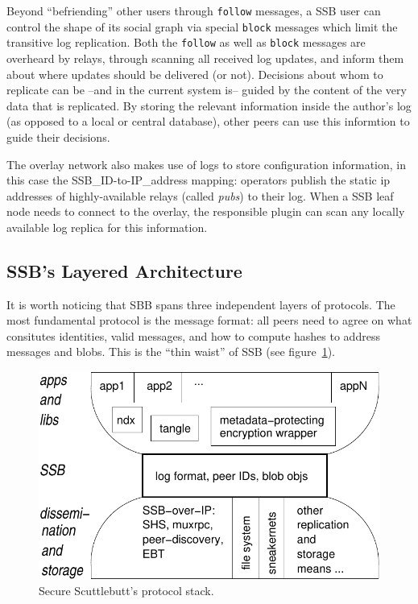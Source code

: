 \documentclass[9pt,sigconf,rewiew]{acmart}
\begin{document}
Beyond ``befriending'' other users through {\tt follow} messages, a SSB user can control the shape of its social graph via special {\tt block} messages which limit the transitive log replication. Both the {\tt follow} as well as {\tt block} messages are overheard by relays, through scanning all received log updates, and inform them about where updates should be delivered (or not). Decisions about whom to replicate can be --and in the current system is-- guided by the content of the very data that is replicated. By storing the relevant information inside the author's log (as opposed to a local or central database), other peers can use this informtion to guide their decisions.

The overlay network also makes use of logs to store configuration information, in this case the SSB\_ID-to-IP\_address mapping: operators publish the static ip addresses of highly-available relays (called {\em pubs}) to their log. When a SSB leaf node needs to connect to the overlay, the responsible plugin can scan any locally available log replica for this information.

\subsection*{SSB's Layered Architecture}

It is worth noticing that SBB spans three independent layers of protocols. The most fundamental protocol is the message format: all peers need to agree on what consitutes identities, valid messages, and how to compute hashes to address messages and blobs. This is the ``thin waist'' of SSB (see figure~\ref{fig:waist}).

\begin{figure}[htb]
  \includegraphics[width=0.9\columnwidth]{figs/ssb-waist.pdf}
  \caption{Secure Scuttlebutt's protocol stack.}
  \label{fig:waist}
\end{figure}
\end{document}
